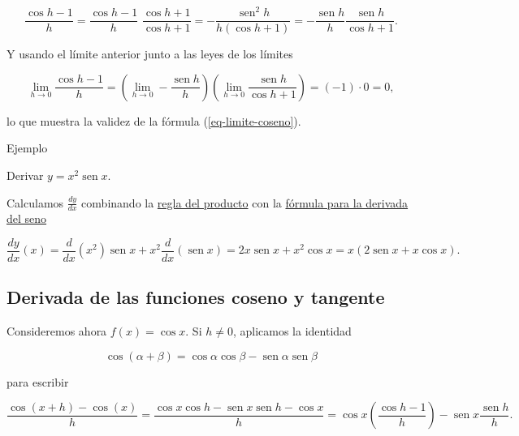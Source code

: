 \documentclass[
  letterpaper,
]{book}
\theoremstyle{plain}
\theoremstyle{remark}
\begin{document}
\[
\frac{\cos h-1}{h}=\frac{\cos h-1}{h}\,\,\frac{\cos h+1}{\cos h+1}=-\frac{\operatorname{sen}^2 h}{h(\cos h+1)}=-\frac{\operatorname{sen} h}{h}\frac{\operatorname{sen} h}{\cos h +1}.
\]

Y usando el límite anterior junto a las leyes de los límites

\[
\lim_{h\to 0} \frac{\cos h-1}{h}=\left(\lim_{h\to 0}-\frac{\operatorname{sen} h}{h}\right)\left(\lim_{h\to 0}\frac{\operatorname{sen} h}{\cos h+1}\right)=(-1)\cdot 0=0,
\]

lo que muestra la validez de la fórmula (\ref{eq-limite-coseno}).

Ejemplo

Derivar \(y=x^2\operatorname{sen} x\).

\begin{tcolorbox}[enhanced jigsaw, opacityback=0, left=2mm, opacitybacktitle=0.6, toprule=.15mm, bottomrule=.15mm, colbacktitle=quarto-callout-tip-color!10!white, titlerule=0mm, bottomtitle=1mm, title=\textcolor{quarto-callout-tip-color}{\faLightbulb}\hspace{0.5em}{Solución}, toptitle=1mm, colframe=quarto-callout-tip-color-frame, colback=white, breakable, rightrule=.15mm, arc=.35mm, leftrule=.75mm, coltitle=black]

Calculamos \(\displaystyle\frac{dy}{dx}\) combinando la
\hyperref[eq-regla-producto]{regla del producto} con la
\hyperref[form-derivada-seno]{fórmula para la derivada del seno}

\[
\frac{dy}{dx}(x)=\frac{d}{dx}\left(x^2\right) \operatorname{sen} x + x^2 \frac{d}{dx}\left(\operatorname{sen} x\right)= 2x\operatorname{sen} x+x^2\cos x=x(2\operatorname{sen} x+x\cos x).
\]

\end{tcolorbox}

\subsection{Derivada de las funciones coseno y
tangente}\label{derivada-de-las-funciones-coseno-y-tangente}

Consideremos ahora \(f(x)=\cos x\). Si \(h\neq 0\), aplicamos la
identidad

\[
\cos(\alpha+\beta)=\cos \alpha \cos \beta -\operatorname{sen} \alpha \operatorname{sen} \beta
\]

para escribir

\[
\frac{\cos(x+h)-\cos(x)}{h}=\frac{\cos x\cos h-\operatorname{sen} x\operatorname{sen} h-\cos x}{h}
    =\cos x\left(\frac{\cos h-1}{h}\right)-\operatorname{sen} x\frac{\operatorname{sen} h}{h}.
\]
\end{document}
